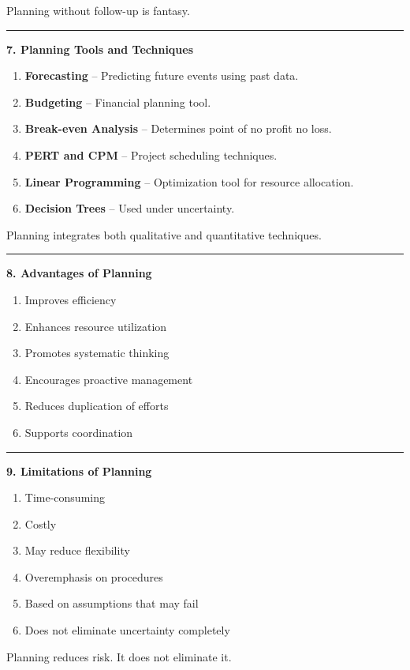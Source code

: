 \documentclass[10pt,a4paper]{article}
\newcommand{\separator}{\vspace{0.4em}\noindent\rule{\linewidth}{0.6pt}\vspace{0.4em}}
\begin{document}
Planning without follow-up is fantasy.

\separator

\textbf{7. Planning Tools and Techniques}

\begin{enumerate}
  \item \textbf{Forecasting} -- Predicting future events using past data.
  \item \textbf{Budgeting} -- Financial planning tool.
  \item \textbf{Break-even Analysis} -- Determines point of no profit no loss.
  \item \textbf{PERT and CPM} -- Project scheduling techniques.
  \item \textbf{Linear Programming} -- Optimization tool for resource allocation.
  \item \textbf{Decision Trees} -- Used under uncertainty.
\end{enumerate}

Planning integrates both qualitative and quantitative techniques.

\separator

\textbf{8. Advantages of Planning}

\begin{enumerate}
  \item Improves efficiency
  \item Enhances resource utilization
  \item Promotes systematic thinking
  \item Encourages proactive management
  \item Reduces duplication of efforts
  \item Supports coordination
\end{enumerate}

\separator

\textbf{9. Limitations of Planning}

\begin{enumerate}
  \item Time-consuming
  \item Costly
  \item May reduce flexibility
  \item Overemphasis on procedures
  \item Based on assumptions that may fail
  \item Does not eliminate uncertainty completely
\end{enumerate}

Planning reduces risk.
It does not eliminate it.
\end{document}
